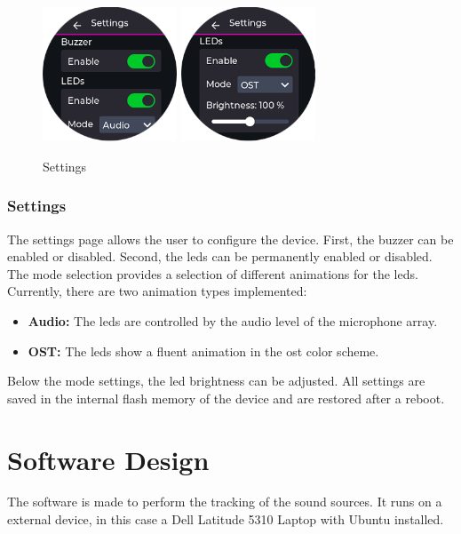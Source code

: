 \begin{minipage}{\linewidth}
	\begin{figure}
		\vspace{-0.6cm}
		\includegraphics[width=4cm, trim={0 -1.0cm 0 0}]{images/6_design_final/gui/13_settings.png}
		\includegraphics[width=4cm]{images/6_design_final/gui/14_settings.png}
		\centering
		\caption{Settings}
		\label{fig:final_design_gui_settings}
	\end{figure}
	\subsubsection{Settings}
	The settings page allows the user to configure the device.
	First, the buzzer can be enabled or disabled.
	Second, the \acrshort{led}s can be permanently enabled or disabled.
	The mode selection provides a selection of different animations for the \acrshort{led}s.
	Currently, there are two animation types implemented:
	\begin{itemize}
		\setlength{\itemindent}{5mm}
		\setlength{\leftmargin}{10mm}
		\item \textbf{Audio:} The \acrshort{led}s are controlled by the audio level of the microphone array.
		\item \textbf{OST:} The \acrshort{led}s show a fluent animation in the \acrshort{ost} color scheme.
	\end{itemize}
	Below the mode settings, the \acrshort{led} brightness can be adjusted.
	All settings are saved in the internal flash memory of the device and are restored after a reboot.
\end{minipage}
\newpage


\section{Software Design}
\label{chap:fin:sw}
The software is made to perform the tracking of the sound sources.
It runs on a external device, in this case a Dell Latitude 5310 Laptop
with Ubuntu installed.

